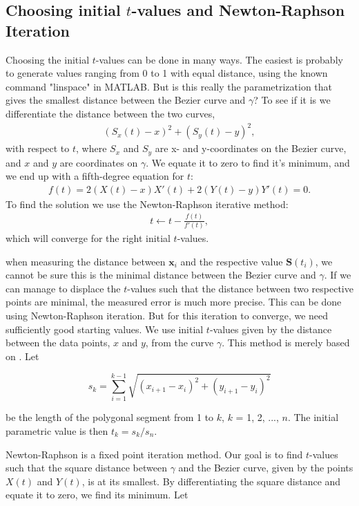 \documentclass[10pt]{article}
\begin{document}
\subsection*{Choosing initial $t$-values and Newton-Raphson Iteration}

Choosing the initial $t$-values can be done in many ways. The easiest is probably to generate values ranging from 0 to 1 with equal distance, using the known command "linspace" in MATLAB. But is this really the parametrization that gives the smallest distance between the Bezier curve and $\gamma$? To see if it is we differentiate the distance between the two curves,
\begin{align}
(S_x(t) - x)^2 + (S_y(t) - y)^2,
\end{align}
with respect to $t$, where $S_x$ and $S_y$ are x- and y-coordinates on the Bezier curve, and $x$ and $y$ are coordinates on $\gamma$. We equate it to zero to find it's minimum, and we end up with a fifth-degree equation for $t$:
\begin{align}
f(t) =  2(X(t)-x)X'(t) + 2(Y(t)-y)Y'(t) = 0.
\end{align}
To find the solution we use the Newton-Raphson iterative method:
\begin{align}
t \gets t - \frac{f(t)}{f'(t)},
\end{align}
which will converge for the right initial $t$-values.



when measuring the distance between $\mathbf{x}_i$ and the respective value $\mathbf{S}(t_i)$, we cannot be sure this is the minimal distance between the Bezier curve and $\gamma$. If we can manage to displace the $t$-values such that the distance between two respective points are minimal, the measured error is much more precise. This can be done using Newton-Raphson iteration. But for this iteration to converge, we need sufficiently good starting values. We use initial $t$-values given by the distance between the data points, $x$ and $y$, from the curve $\gamma$. This method is merely based on \cite{Plass:1983}. Let

\begin{equation}
s_k = \sum_{i=1}^{k-1} \sqrt{(x_{i+1}-x_i)^2 + (y_{i+1}-y_i)^2}
\end{equation}

be the length of the polygonal segment from 1 to $k$, $k$ = 1, 2, ..., $n$. The initial parametric value is then $t_k = s_k/s_n$.

Newton-Raphson is a fixed point iteration method. Our goal is to find $t$-values such that the square distance between $\gamma$ and the Bezier curve, given by the points $X(t)$ and $Y(t)$, is at its smallest. By  differentiating the square distance and equate it to zero, we find its minimum. Let
\end{document}
